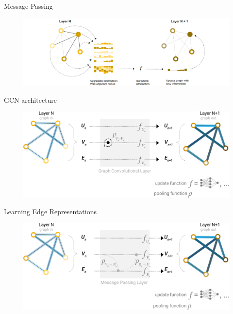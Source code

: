 \documentclass[
    11pt, %
    aspectratio=169, %
]{beamer}
\begin{document}
\begin{frame}{Message Passing}
    \begin{figure}
        \centering
        \includegraphics[width=.8\textwidth]{Images/message-passing.png}
    \end{figure}
\end{frame}

\begin{frame}{GCN architecture}
    \begin{figure}
        \centering
        \includegraphics[width=.8\textwidth]{Images/GCN-schematic.png}
    \end{figure}
\end{frame}

\begin{frame}{Learning Edge Representations}
    \begin{figure}
        \centering
        \includegraphics[width=.8\textwidth]{Images/message-passing-schematic.png}
    \end{figure}
\end{frame}
\end{document}
